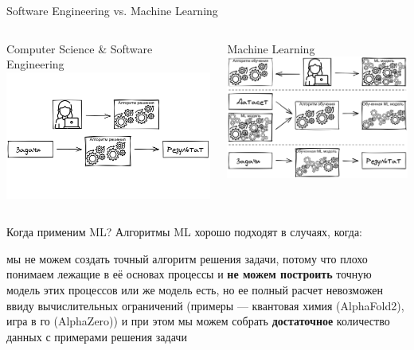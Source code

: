 \documentclass[aspectratio=169, professionalfonts]{beamer}
\begin{document}
\begin{frame}{Software Engineering vs. Machine Learning}
    \begin{columns}[T]
        \begin{column}{.49\linewidth}
            \centering
            Computer Science \& Software Engineering
            \includegraphics[width=\linewidth]{figures/fig40-swe-approach.jpg}
        \end{column}
        \pause
        \begin{column}{.49\linewidth}
            \centering
            Machine Learning
            \includegraphics[width=\linewidth]{figures/fig41-ml-approach.jpg}
        \end{column}
    \end{columns}
\end{frame}

\begin{frame}{Когда применим ML?}
    Алгоритмы ML хорошо подходят в случаях, когда:
    \begin{outline}
        \1 мы не можем создать точный алгоритм решения задачи, потому что плохо понимаем
        лежащие в её основах процессы и \textbf{не можем построить} точную модель этих процессов
        \pause
        \1 или же модель есть, но ее полный расчет невозможен ввиду вычислительных
        ограничений (примеры --- квантовая химия (AlphaFold2), игра в го (AlphaZero))
        \pause
        \1 и при этом мы можем собрать \textbf{достаточное} количество данных с примерами
        решения задачи
    \end{outline}
\end{frame}
\end{document}
